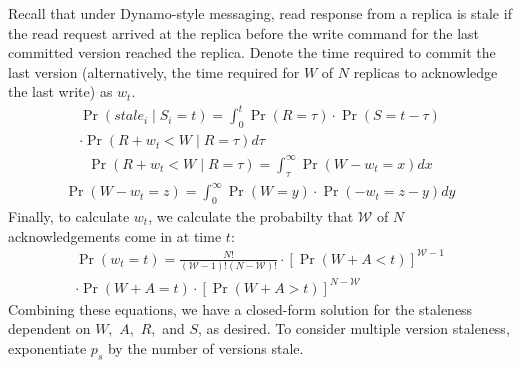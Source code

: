 \documentclass{vldb}
\begin{document}
\begin{appendix}
 Recall that under Dynamo-style messaging, read response from a
 replica is stale if the read request arrived at the replica before
 the write command for the last committed version reached the replica.
 Denote the time required to commit the last version (alternatively, the time required for $W$ of $N$ replicas to acknowledge the last write) as $w_t$.
\begin{multline*}
\Pr(stale_i \mid S_i = t) = \int_{0}^{t} \Pr(R=\tau)\cdot\Pr(S=t-\tau)\\\cdot\Pr(R+w_t < W \mid R = \tau) d\tau
\end{multline*}
\begin{multline*}
  \Pr(R+w_t < W \mid R = \tau) = \int_{\tau}^{\infty} \Pr(W-w_t = x) dx
\end{multline*}
\begin{multline*}
  \Pr(W-w_t = z) = \int_{0}^{\infty} \Pr(W = y) \cdot \Pr(-w_t = z-y) dy
\end{multline*}
Finally, to calculate $w_t$, we calculate the probabilty that
$\mathcal{W}$ of $N$ acknowledgements come in at time $t$:
\begin{multline*}
\Pr(w_t = t) = \frac{N!}{(\mathcal{W}-1)!(N-\mathcal{W})!}\cdot[\Pr(W+A< t)]^{\mathcal{W}-1}\\\cdot\Pr(W+A = t)\cdot[\Pr(W+A > t)]^{N-\mathcal{W}}
\end{multline*}
Combining these equations, we have a closed-form solution for the
staleness dependent on $W,$ $A,$ $R,$ and $S$, as desired.  To consider
multiple version staleness, exponentiate $p_s$ by the number of
versions stale.

\end{appendix}
\end{document}
